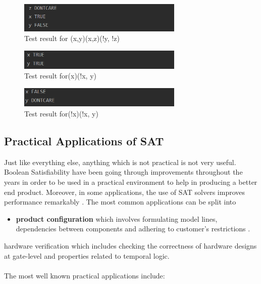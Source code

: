 \documentclass{article}
\begin{document}
				\begin{figure}[H]
					\centering
			 			\includegraphics[width=0.7\textwidth]{dplltest8.png}
			 			\centering
			  			\caption{Test result for (x,y)(x,z)(!y, !z)}
			  			\label{fig:dplltest8}
					\end{figure}	
					
				\begin{figure}[H]
					\centering
			 			\includegraphics[width=0.7\textwidth]{dplltest9.png}
			 			\centering
			  			\caption{Test result for(x)(!x, y)}
			  			\label{fig:dplltest9}
					\end{figure}						
		
								\begin{figure}[H]
					\centering
			 			\includegraphics[width=0.7\textwidth]{dplltest10.png}
			 			\centering
			  			\caption{Test result for(!x)(!x, y)}
			  			\label{fig:dplltest10}
					\end{figure}		
					
			\subsection{Practical Applications of SAT}
			
			Just like everything else, anything which is not practical is not very useful. Boolean Satisfiability have been going through improvements throughout the years in order to be used in a practical environment to help in producing a better end product. Moreover, in some
applications, the use of SAT solvers improves performance remarkably \cite{pa3}. The most common applications can be split into 
\begin{itemize}
\item\textbf{product configuration} which involves formulating model lines,  dependencies between components and adhering to customer's restrictions \cite{pa2}.
\end{itemize}
  hardware verification which includes checking the correctness of hardware designs at gate-level and properties related to temporal logic\cite{pa1}.	\\\\
The most well known practical applications include:
\end{document}
